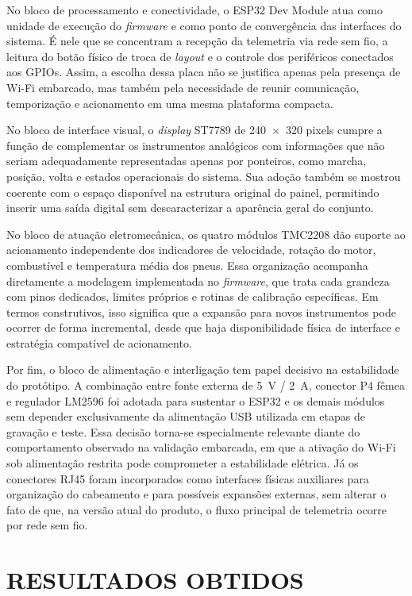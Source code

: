 \documentclass[
  12pt,
  oneside,
  a4paper,
  chapter=TITLE,
  section=TITLE,
  subsection=TITLE,
  brazil
]{abntex2}
\newcommand{\estrangeirismo}[1]{\textit{#1}}
\begin{document}
No bloco de processamento e conectividade, o ESP32 Dev Module atua como unidade de execução do \estrangeirismo{firmware} e como ponto de convergência das interfaces do sistema. É nele que se concentram a recepção da telemetria via rede sem fio, a leitura do botão físico de troca de \estrangeirismo{layout} e o controle dos periféricos conectados aos GPIOs. Assim, a escolha dessa placa não se justifica apenas pela presença de Wi-Fi embarcado, mas também pela necessidade de reunir comunicação, temporização e acionamento em uma mesma plataforma compacta.

No bloco de interface visual, o \estrangeirismo{display} ST7789 de 240~$\times$~320 pixels cumpre a função de complementar os instrumentos analógicos com informações que não seriam adequadamente representadas apenas por ponteiros, como marcha, posição, volta e estados operacionais do sistema. Sua adoção também se mostrou coerente com o espaço disponível na estrutura original do painel, permitindo inserir uma saída digital sem descaracterizar a aparência geral do conjunto.

No bloco de atuação eletromecânica, os quatro módulos TMC2208 dão suporte ao acionamento independente dos indicadores de velocidade, rotação do motor, combustível e temperatura média dos pneus. Essa organização acompanha diretamente a modelagem implementada no \estrangeirismo{firmware}, que trata cada grandeza com pinos dedicados, limites próprios e rotinas de calibração específicas. Em termos construtivos, isso significa que a expansão para novos instrumentos pode ocorrer de forma incremental, desde que haja disponibilidade física de interface e estratégia compatível de acionamento.

Por fim, o bloco de alimentação e interligação tem papel decisivo na estabilidade do protótipo. A combinação entre fonte externa de 5~V / 2~A, conector P4 fêmea e regulador LM2596 foi adotada para sustentar o ESP32 e os demais módulos sem depender exclusivamente da alimentação USB utilizada em etapas de gravação e teste. Essa decisão torna-se especialmente relevante diante do comportamento observado na validação embarcada, em que a ativação do Wi-Fi sob alimentação restrita pode comprometer a estabilidade elétrica. Já os conectores RJ45 foram incorporados como interfaces físicas auxiliares para organização do cabeamento e para possíveis expansões externas, sem alterar o fato de que, na versão atual do produto, o fluxo principal de telemetria ocorre por rede sem fio.


\chapter{RESULTADOS OBTIDOS}
\label{chap:resultados}
\end{document}
